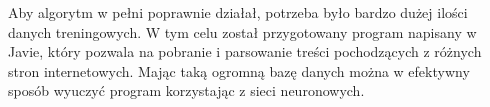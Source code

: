 Aby algorytm w pełni poprawnie działał, potrzeba było bardzo dużej ilości danych treningowych. W tym celu został przygotowany program napisany w Javie, który pozwala na pobranie i parsowanie treści pochodzących z różnych stron internetowych. Mając taką ogromną bazę danych można w efektywny sposób wyuczyć program korzystając z sieci neuronowych.


